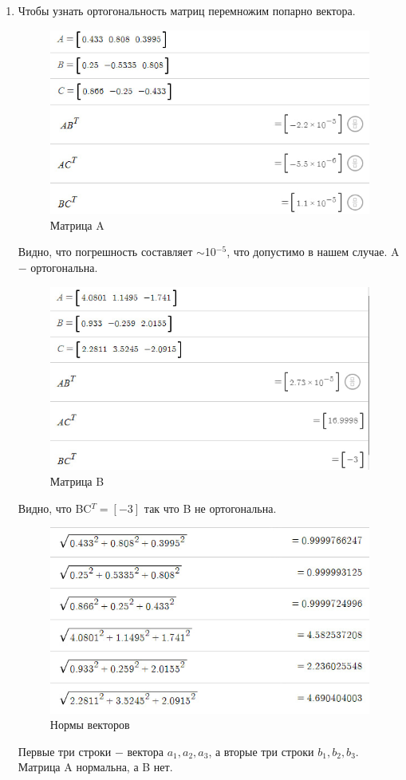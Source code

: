 \begin{enumerate}
    \item 
        Чтобы узнать ортогональность матриц перемножим попарно вектора.\\
        \begin{figure}[H]
            \centering
            \includegraphics[width=0.6\linewidth]{images/2_A_orto}
            \caption{Матрица A} 
        \end{figure}
        Видно, что погрешность составляет $\sim$10$^{-5}$, что допустимо в нашем случае. A $-$ ортогональна.\\
        \begin{figure}[H]
            \centering
            \includegraphics[width=0.6\linewidth]{images/2_B_orto}
            \caption{Матрица B}
        \end{figure}
        Видно, что BC$^T = [-3]$ так что B не ортогональна.\\
        \begin{figure}[H]
            \centering
            \includegraphics[width=0.6\linewidth]{images/2_AB_norm}
            \caption{Нормы векторов}
        \end{figure}
        Первые три строки $-$ вектора $a_1, a_2, a_3$, а вторые три строки $b_1, b_2, b_3$. Матрица A нормальна, а B нет.\\
        

\end{enumerate}
